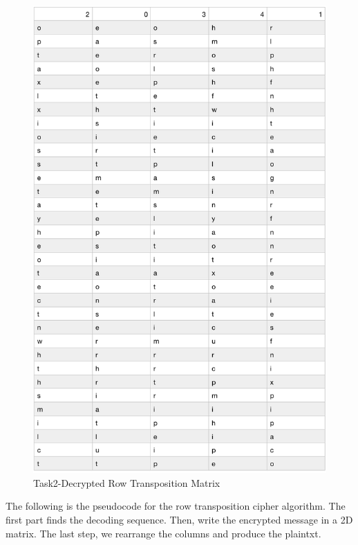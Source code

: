 \documentclass[twoside,twocolumn]{article}
\begin{document}
\begin{figure}[H]
  \centering
  \includegraphics[scale=0.39]{./Graphs/Figure1.8.png}
  \caption{Task2-Decrypted Row Transposition Matrix \\}
  \label{fig:testfig1}
\end{figure}

\vspace*{-0.15cm}
The following is the pseudocode for the row transposition cipher algorithm. The first part finds the decoding sequence. Then, write the encrypted message in a 2D matrix. The last step, we rearrange the columns and produce the plaintxt. 
\end{document}
